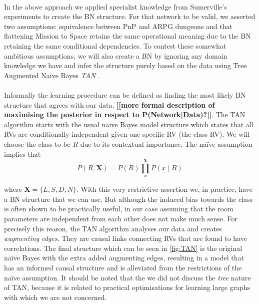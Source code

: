 \documentclass{UoYCSproject}
\begin{document}
\paragraph{}
In the above approach we applied specialist knowledge from Sumerville's experiments to create the BN structure. For that network to be valid, we asserted two assumptions: equivalence between PnP and ARPG dungeons and that flattening Mission to Space retains the same operational meaning due to the BN retaining the same conditional dependencies. To contest these somewhat ambitious assumptions, we will also create a BN by ignoring any domain knowledge we have and infer the structure purely based on the data using Tree Augmented Na\"{i}ve Bayes \textit{TAN} \parencite{FriedmanTAN}.  
\paragraph{}
Informally the learning procedure can be defined as finding the most likely BN structure that agrees with our data. \textbf{[[more formal description of maximising the posterior in respect to P(Network|Data)?]]}. The TAN algorithm starts with the usual na\"{i}ve Bayes model structure which states that all RVs are conditionally independent given one specific RV (the class RV). We will choose the class to be \(R\) due to its contextual importance. The na\"{i}ve assumption implies that
\begin{equation}
  \label{eq:TAN}
  P(R,\boldsymbol X) = P(R)\prod_{x}^{\boldsymbol X} P(x \mid R)
\end{equation}

where \(\boldsymbol X = \{L, S, D, N\}\). With this very restrictive assertion we, in practice, have a BN structure that we can use. But although the induced bias towards the class is often shown to be practically useful, in our case assuming that the room parameters are independent from each other does not make much sense. For precisely this reason, the TAN algorithm analyses our data and creates \textit{augmenting edges}. They are causal links connecting RVs that are found to have correlations. The final structure which can be seen in \ref{fig:TAN} is the original na\"{i}ve Bayes with the extra added augmenting edges, resulting in a model that has an informed causal structure and is alleviated from the restrictions of the na\"{i}ve assumption. It should be noted that the we did not discuss the \textit{tree} nature of TAN, because it is related to practical optimisations for learning large graphs with which we are not concerned.
\end{document}
